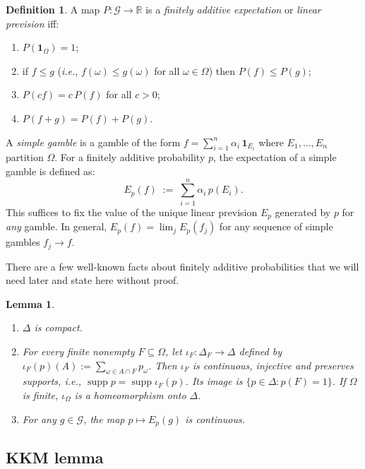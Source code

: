 \documentclass[11pt]{article}
\newtheorem{lemma}[theorem]{Lemma}
\theoremstyle{definition}
\newtheorem{definition}[theorem]{Definition}
\theoremstyle{remark}
\newcommand{\G}{\mathcal G}
\newcommand{\supp}{\operatorname{supp}}
\begin{document}
\begin{definition}\label{def:finitely-additive-expectation}
A map $P\colon\G\to\mathbb R$ is a \textit{finitely additive expectation} or \textit{linear prevision} iff:
\begin{enumerate}[label=\textup{(LNP\arabic*)}]
  \item $P(\mathbf{1}_\Omega)=1$;
  \item if $f\leq g$ (\textit{i.e.}, $f(\omega)\leq g(\omega)$ for all $\omega\in\Omega$) then $P(f)\leq P(g)$;
  \item $P(cf)=c\,P(f)$ for all $c>0$;
  \item $P(f+g)=P(f)+P(g)$.
\end{enumerate}
\end{definition}

A \emph{simple gamble} is a gamble of the form $f=\sum_{i=1}^{n}\alpha_i\,\mathbf{1}_{E_i}$ where $E_1,\ldots,E_n$ partition $\Omega$. For a finitely additive probability $p$, the expectation of a simple gamble is defined as:
\[
  E_p(f) \;:=\; \sum_{i=1}^{n}\alpha_i\,p(E_i).
\]
This suffices to fix the value of the unique linear prevision $E_p$ generated by $p$ for \textit{any} gamble. In general, $E_p(f)=\lim_jE_p(f_j)$ for any sequence of simple gambles $f_j\to f$.


There are a few well-known facts about finitely additive probabilities that we will need later and state here without proof. 


\begin{lemma}\label{lem:prob}
\leavevmode
\begin{enumerate}[label=(\alph*)]
\item $\Delta$ is compact.
\item For every finite nonempty $F\subseteq\Omega$, let $\iota_F:\Delta_F\to\Delta$ defined by $\iota_F(p)(A):=\sum_{\omega\in A\cap F}p_\omega$. Then $\iota_F$ is continuous, injective and preserves supports, \textit{i.e.}, $\supp p = \supp \iota_F(p)$. Its image is $\{p\in\Delta:p(F)=1\}$. If $\Omega$ is finite, $\iota_\Omega$ is a homeomorphism onto $\Delta$.
\item For any $g\in\G$, the map $p\mapsto E_p(g)$ is continuous. 
\end{enumerate}
\end{lemma}



\subsection{KKM lemma}\label{sec:kkm}
\end{document}
